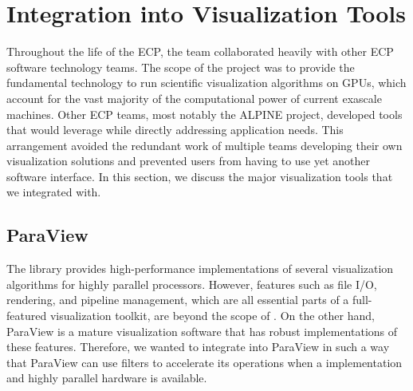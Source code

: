 \section{Integration into Visualization Tools}

Throughout the life of the ECP, the \vtkm team collaborated heavily with other ECP software technology teams.
The scope of the \vtkm project was to provide the fundamental technology to run scientific visualization algorithms on GPUs, which account for the vast majority of the computational power of current exascale machines.
Other ECP teams, most notably the ALPINE project, developed tools that would leverage \vtkm while directly addressing application needs.
This arrangement avoided the redundant work of multiple teams developing their own visualization solutions and prevented users from having to use yet another software interface.
In this section, we discuss the major visualization tools that we integrated \vtkm with.


\subsection{ParaView}

The \vtkm library provides high-performance implementations of several visualization algorithms for highly parallel processors.
However, features such as file I/O, rendering, and pipeline management, which are all essential parts of a full-featured visualization toolkit, are beyond the scope of \vtkm.
On the other hand, ParaView is a mature visualization software that has robust implementations of these features.
Therefore, we wanted to integrate \vtkm into ParaView in such a way that ParaView can use \vtkm filters to accelerate its operations when a \vtkm implementation and highly parallel hardware is available.

